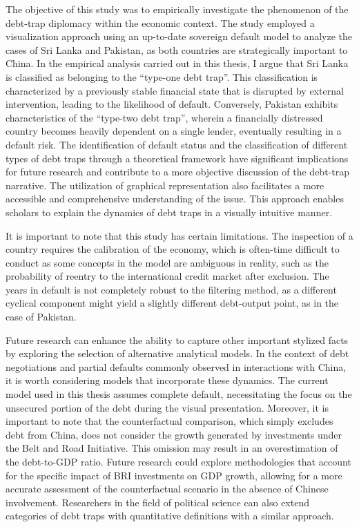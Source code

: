 The objective of this study was to empirically investigate the phenomenon of the debt-trap diplomacy within the economic context. The study employed a visualization approach using an up-to-date sovereign default model to analyze the cases of Sri Lanka and Pakistan, as both countries are strategically important to China.
In the empirical analysis carried out in this thesis, I argue that Sri Lanka is classified as belonging to the ``type-one debt trap''. This classification is characterized by a previously stable financial state that is disrupted by external intervention, leading to the likelihood of default. Conversely, Pakistan exhibits characteristics of the ``type-two debt trap'', wherein a financially distressed country becomes heavily dependent on a single lender, eventually resulting in a default risk.
The identification of default status and the classification of different types of debt traps through a theoretical framework have significant implications for future research and contribute to a more objective discussion of the debt-trap narrative. The utilization of graphical representation also facilitates a more accessible and comprehensive understanding of the issue. This approach enables scholars to explain the dynamics of debt traps in a visually intuitive manner.

It is important to note that this study has certain limitations. The inspection of a country requires the calibration of the economy, which is often-time difficult to conduct as some concepts in the model are ambiguous in reality, such as the probability of reentry to the international credit market after exclusion. The years in default is not completely robust to the filtering method, as a different cyclical component might yield a slightly different debt-output point, as in the case of Pakistan.

Future research can enhance the ability to capture other important stylized facts by exploring the selection of alternative analytical models. In the context of debt negotiations and partial defaults commonly observed in interactions with China, it is worth considering models that incorporate these dynamics. The current model used in this thesis assumes complete default, necessitating the focus on the unsecured portion of the debt during the visual presentation.
Moreover, it is important to note that the counterfactual comparison, which simply excludes debt from China, does not consider the growth generated by investments under the Belt and Road Initiative. This omission may result in an overestimation of the debt-to-GDP ratio. Future research could explore methodologies that account for the specific impact of BRI investments on GDP growth, allowing for a more accurate assessment of the counterfactual scenario in the absence of Chinese involvement. Researchers in the field of political science can also extend categories of debt traps with quantitative definitions with a similar approach.